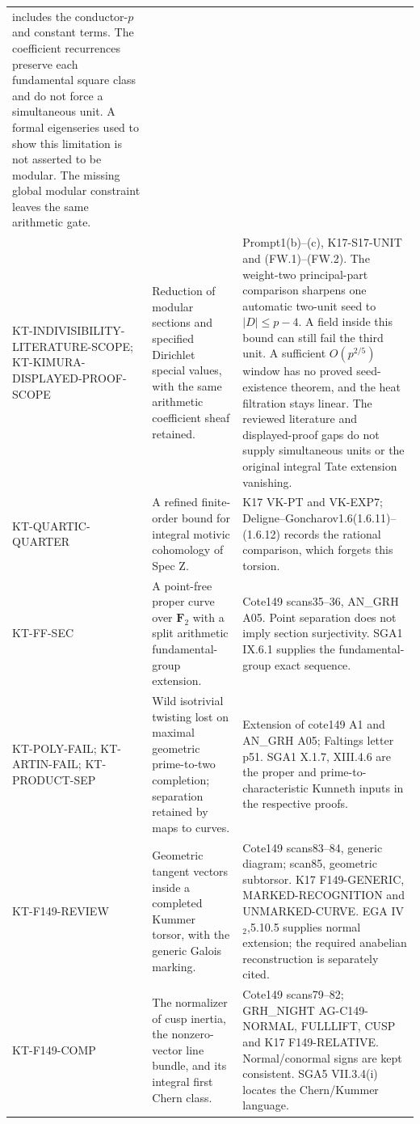 \begin{longtable}{>{\raggedright\arraybackslash}p{}
>{\raggedright\arraybackslash}p{}
>{\raggedright\arraybackslash}p{}}
includes the conductor-$p$ and constant terms. The coefficient
recurrences preserve each fundamental square class and do not
force a simultaneous unit. A formal eigenseries used to show
this limitation is not asserted to be modular. The missing
global modular constraint leaves the same arithmetic gate.\\
KT-INDIVISIBILITY-LITERATURE-SCOPE;
KT-KIMURA-DISPLAYED-PROOF-SCOPE &
Reduction of modular sections and specified Dirichlet special values,
with the same arithmetic coefficient sheaf retained. &
Prompt1(b)--(c), K17-S17-UNIT and (FW.1)--(FW.2).
The weight-two principal-part comparison sharpens one automatic
two-unit seed to $|D|\leq p-4$. A field inside this bound can still
fail the third unit. A sufficient $O(p^{2/5})$ window has no proved
seed-existence theorem, and the heat filtration stays linear.
The reviewed literature and displayed-proof gaps do not supply
simultaneous units or the original integral Tate extension vanishing.\\
KT-QUARTIC-QUARTER &
A refined finite-order bound for integral motivic cohomology
of Spec Z. &
K17 VK-PT and VK-EXP7; Deligne--Goncharov1.6(1.6.11)--(1.6.12)
records the rational comparison, which forgets this torsion.\\
KT-FF-SEC &
A point-free proper curve over $\mathbf F_2$ with a split
arithmetic fundamental-group extension. &
Cote149 scans35--36, AN\_GRH A05. Point separation does not
imply section surjectivity. SGA1 IX.6.1 supplies the
fundamental-group exact sequence.\\
KT-POLY-FAIL; KT-ARTIN-FAIL; KT-PRODUCT-SEP &
Wild isotrivial twisting lost on maximal geometric
prime-to-two completion; separation retained by maps to curves. &
Extension of cote149 A1 and AN\_GRH A05; Faltings letter p51.
SGA1 X.1.7, XIII.4.6 are the proper and prime-to-characteristic
Kunneth inputs in the respective proofs.\\
KT-F149-REVIEW &
Geometric tangent vectors inside a completed Kummer torsor,
with the generic Galois marking. &
Cote149 scans83--84, generic diagram; scan85, geometric
subtorsor. K17 F149-GENERIC, MARKED-RECOGNITION and
UNMARKED-CURVE. EGA IV$_2$,5.10.5 supplies normal extension;
the required anabelian reconstruction is separately cited.\\
KT-F149-COMP &
The normalizer of cusp inertia, the nonzero-vector line bundle,
and its integral first Chern class. &
Cote149 scans79--82; GRH\_NIGHT AG-C149-NORMAL, FULLLIFT,
CUSP and K17 F149-RELATIVE. Normal/conormal signs are kept
consistent. SGA5 VII.3.4(i) locates the Chern/Kummer language.\\

\end{longtable}
